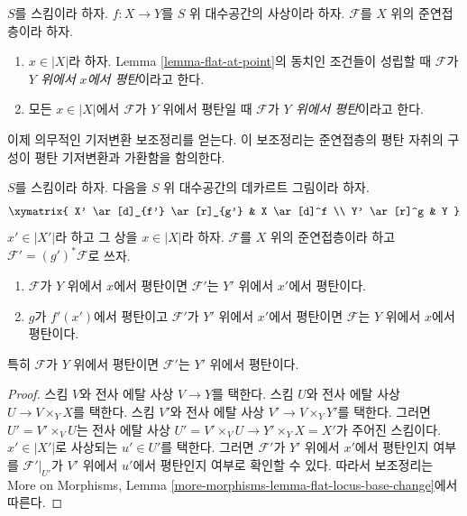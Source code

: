 \begin{definition}
\label{definition-flat-module}
$S$를 스킴이라 하자.
$f : X \to Y$를 $S$ 위 대수공간의 사상이라 하자.
$\mathcal{F}$를 $X$ 위의 준연접층이라 하자.
\begin{enumerate}
\item $x \in |X|$라 하자. Lemma \ref{lemma-flat-at-point}의
동치인 조건들이 성립할 때 $\mathcal{F}$가
{\it $Y$ 위에서 $x$에서 평탄}이라고 한다.
\item 모든 $x \in |X|$에서 $\mathcal{F}$가 $Y$ 위에서
평탄일 때 $\mathcal{F}$가 {\it $Y$ 위에서 평탄}이라고 한다.
\end{enumerate}
\end{definition}

\noindent
이제 의무적인 기저변환 보조정리를 얻는다.
이 보조정리는 준연접층의 평탄 자취의 구성이 평탄 기저변환과
가환함을 함의한다.

\begin{lemma}
\label{lemma-base-change-module-flat}
$S$를 스킴이라 하자. 다음을 $S$ 위 대수공간의 데카르트 그림이라 하자.
$$
\xymatrix{
X' \ar[d]_{f'} \ar[r]_{g'} & X \ar[d]^f \\
Y' \ar[r]^g & Y
}
$$
$x' \in |X'|$라 하고 그 상을 $x \in |X|$라 하자.
$\mathcal{F}$를 $X$ 위의 준연접층이라 하고
$\mathcal{F}' = (g')^*\mathcal{F}$로 쓰자.
\begin{enumerate}
\item $\mathcal{F}$가 $Y$ 위에서 $x$에서 평탄이면
$\mathcal{F}'$는 $Y'$ 위에서 $x'$에서 평탄이다.
\item $g$가 $f'(x')$에서 평탄이고 $\mathcal{F}'$가
$Y'$ 위에서 $x'$에서 평탄이면 $\mathcal{F}$는
$Y$ 위에서 $x$에서 평탄이다.
\end{enumerate}
특히 $\mathcal{F}$가 $Y$ 위에서 평탄이면
$\mathcal{F}'$는 $Y'$ 위에서 평탄이다.
\end{lemma}

\begin{proof}
스킴 $V$와 전사 에탈 사상 $V \to Y$를 택한다.
스킴 $U$와 전사 에탈 사상 $U \to V \times_Y X$를 택한다.
스킴 $V'$와 전사 에탈 사상 $V' \to V \times_Y Y'$를 택한다.
그러면 $U' = V' \times_V U$는 전사 에탈 사상
$U' = V' \times_V U \to Y' \times_Y X = X'$가 주어진 스킴이다.
$x' \in |X'|$로 사상되는 $u' \in U'$를 택한다.
그러면 $\mathcal{F}'$가 $Y'$ 위에서 $x'$에서 평탄인지 여부를
$\mathcal{F}'|_{U'}$가 $V'$ 위에서 $u'$에서 평탄인지 여부로
확인할 수 있다. 따라서 보조정리는 More on Morphisms, Lemma
\ref{more-morphisms-lemma-flat-locus-base-change}에서 따른다.
\end{proof}

